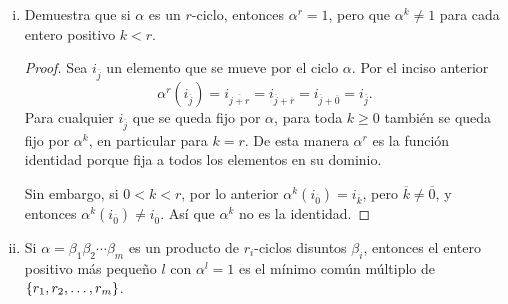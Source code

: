 \begin{enumerate}[(i)]
\begin{proof}
            Supongamos que para alguna \( k\geq 0 \) se tiene que para toda \( \overline{j}\in
            \Z_{r}\), \( \alpha^k \left( i_{\overline{j}} \right) = i_{\overline{j+k}} \).
            Al aplicar nuevamente \( \alpha \) obtenemos que para toda \( \overline{t}\in
            \Z_{r}\) 
            \begin{align*}
                \alpha^{k+1}
                \left( i_{\overline{t}} \right) 
                &=
                \alpha 
                \left( 
                    \alpha^k
                    \left(
                    i_{\overline{t}}
                    \right)
                \right) \\
                &=
                \alpha \left( i_{\overline{t+k}} \right) ,\quad\text{por la hipótesis de inducción,}\\
            \end{align*}
            Sin embargo, como \( \alpha \) es un ciclo, 
            tenemos \( \alpha \left( i_{\overline{t+k}} \right) 
            = i_{\overline{t+k}+\overline{1}}
            = i_{\overline{t+k+1}}\).
            Por lo tanto 
            \( \alpha^{k+1} \left( i_{\overline{j}} \right) 
            = i_{\overline{j+k+1}}\). Por el principio de inducción, se satisface lo anterior 
            para cada \( k\geq 0 \).
        \end{proof}
    \item
        Demuestra que si \( \alpha \) es un \( r \)-ciclo,
        entonces \( \alpha^r=1 \), pero que \( \alpha^k \neq 1 \) para cada 
        entero positivo \( k<r \).
        \begin{proof}
            Sea \( i_{\overline{j}}\) un elemento que se mueve por el ciclo \( \alpha \).
            Por el inciso anterior
            \[
                \alpha^r \left( i_{\overline{j}} \right) 
                =
                i_{\overline{j+r}}
                =
                i_{\overline{j}+\overline{r}}
                =
                i_{\overline{j}+\overline{0}}
                =
                i_{\overline{j}}.
            \]
            Para cualquier \( i_{\overline{j}} \) que se queda fijo por \( \alpha \), 
            para toda \( k\geq 0 \) también se queda fijo por \( \alpha^k \),
            en particular para \( k = r \).
            De esta manera \( \alpha^r \) es la función identidad porque fija a todos los elementos
            en su dominio.
            
            Sin embargo, si \( 0<k<r \), por lo anterior \( \alpha^k \left( i_{\overline{0}} \right)
            = i_{\overline{k}}\), pero \( \overline{k} \neq \overline{0} \), y
            entonces \( \alpha^k \left( i_{\overline{0}} \right) \neq i_{\overline{0}} \). 
            Así que \( \alpha^k\) no es la identidad.
        \end{proof}
    \item
        Si \( \alpha=\beta_1\beta_2\cdots \beta_m \) es un producto de \( r_i \)-ciclos 
        disuntos \( \beta_i \), entonces el 
        entero positivo más pequeño \( l \) con \( \alpha^l = 1\) es el mínimo común múltiplo de 
        \( \left\{ r_1,r_2,\ldots,r_m \right\} \).


\end{enumerate}
